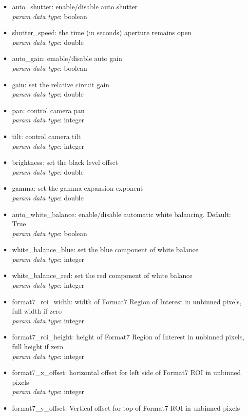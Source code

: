 \begin{itemize}
\begin{itemize}
\item auto\_shutter: enable/disable auto shutter\\
\textit{param data type}: boolean
\item shutter\_speed: the time (in seconds) aperture remains open\\
\textit{param data type}: double
\item auto\_gain: emable/disable auto gain\\
\textit{param data type}: boolean
\item gain: set the relative circuit gain\\
\textit{param data type}: double
\item pan: control camera pan\\
\textit{param data type}: integer
\item tilt: control camera tilt\\
\textit{param data type}: integer
\item brightness: set the black level offset\\
\textit{param data type}: double
\item gamma: set the gamma expansion exponent\\
\textit{param data type}: double
\item auto\_white\_balance: enable/disable automatic white balancing. Default: True\\
\textit{param data type}: boolean
\item white\_balance\_blue: set the blue component of white balance\\
\textit{param data type}: integer
\item white\_balance\_red: set the red component of white balance\\
\textit{param data type}: integer
\item format7\_roi\_width: width of Format7 Region of Interest in unbinned pixels, full width if zero \\
\textit{param data type}: integer
\item format7\_roi\_height: height of Format7 Region of Interest in unbinned pixels, full height if zero\\
\textit{param data type}: integer
\item format7\_x\_offset: horizontal offset for left side of Format7 ROI in unbinned pixels\\
\textit{param data type}: integer
\item format7\_y\_offset: Vertical offset for top of Format7 ROI in unbinned pixels\\

\end{itemize}
\end{itemize}
